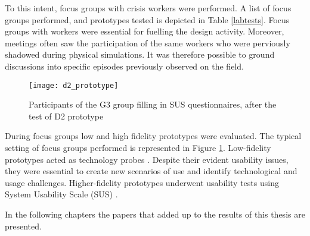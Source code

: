 To this intent, focus groups with crisis workers were performed. A list of focus groups performed, and prototypes tested is depicted in Table \ref{labtests}. Focus groups with workers were essential for fuelling the design activity. Moreover, meetings often saw the participation of the same workers who were perviously shadowed during physical simulations. It was therefore possible to ground discussions into specific episodes previously observed on the field.

\begin{figure}
	[tbh] \centering 
	\texttt{[image: d2\_prototype]} \caption{Participants of the G3 group filling in SUS questionnaires, after the test of D2 prototype} \label{fig:focus-group} 
\end{figure}

During focus groups low and high fidelity prototypes were evaluated. The typical setting of focus groups performed is represented in Figure \ref{fig:focus-group}. Low-fidelity prototypes acted as technology probes \autocite{Hutchinson:2003il}. Despite their evident usability issues, they were essential to create new scenarios of use and identify technological and usage challenges. Higher-fidelity prototypes underwent usability tests \autocite{Dumas:2009th} using System Usability Scale (SUS) \autocite[ pag.189]{jordan1996usability}.

In the following chapters the papers that added up to the results of this thesis are presented.
